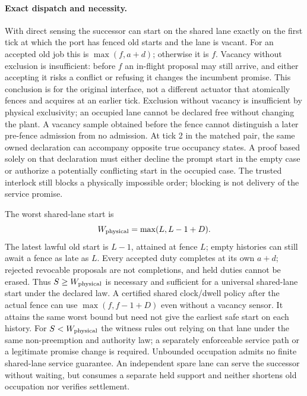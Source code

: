 \documentclass[11pt]{article}
\begin{document}
\paragraph{Exact dispatch and necessity.}
With direct sensing the successor can start on the shared lane exactly on the first tick at which the port has fenced old starts and the lane is vacant. For an accepted old job this is $\max(f,a+d)$; otherwise it is $f$. Vacancy without exclusion is insufficient: before $f$ an in-flight proposal may still arrive, and either accepting it risks a conflict or refusing it changes the incumbent promise. This conclusion is for the original interface, not a different actuator that atomically fences and acquires at an earlier tick. Exclusion without vacancy is insufficient by physical exclusivity; an occupied lane cannot be declared free without changing the plant. A vacancy sample obtained before the fence cannot distinguish a later pre-fence admission from no admission. At tick 2 in the matched pair, the same owned declaration can accompany opposite true occupancy states. A proof based solely on that declaration must either decline the prompt start in the empty case or authorize a potentially conflicting start in the occupied case. The trusted interlock still blocks a physically impossible order; blocking is not delivery of the service promise.

The worst shared-lane start is
\[
 W_{\rm physical}=\max(L,L-1+D).
\]
The latest lawful old start is $L-1$, attained at fence $L$; empty histories can still await a fence as late as $L$. Every accepted duty completes at its own $a+d$; rejected revocable proposals are not completions, and held duties cannot be erased. Thus $S\ge W_{\rm physical}$ is necessary and sufficient for a universal shared-lane start under the declared law. A certified shared clock/dwell policy after the actual fence can use $\max(f,f-1+D)$ even without a vacancy sensor. It attains the same worst bound but need not give the earliest safe start on each history. For $S<W_{\rm physical}$ the witness rules out relying on that lane under the same non-preemption and authority law; a separately enforceable service path or a legitimate promise change is required. Unbounded occupation admits no finite shared-lane service guarantee. An independent spare lane can serve the successor without waiting, but consumes a separate held support and neither shortens old occupation nor verifies settlement.
\end{document}
